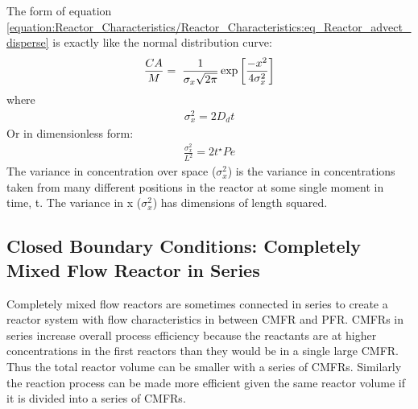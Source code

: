 \documentclass[letterpaper,10pt,english]{sphinxmanual}
\begin{document}
The form of equation \eqref{equation:Reactor_Characteristics/Reactor_Characteristics:eq_Reactor_advect_disperse} is exactly like the normal distribution curve:
\begin{equation}\label{equation:Reactor_Characteristics/Reactor_Characteristics:Reactor_Characteristics/Reactor_Characteristics:8}
\begin{split}\frac{CA}{M} ={\rm \; }\frac{1}{\sigma _{x} \sqrt{2\pi } } \exp \left[\frac{-x^{2} }{4\sigma _{x}^{2} } \right]\end{split}
\end{equation}
where
\begin{equation}\label{equation:Reactor_Characteristics/Reactor_Characteristics:eq_Reactor_sigma_dispersion}
\begin{split} \sigma _{x}^{2} =2D_{d} t\end{split}
\end{equation}
Or in dimensionless form:
\begin{equation}\label{equation:Reactor_Characteristics/Reactor_Characteristics:Reactor_Characteristics/Reactor_Characteristics:9}
\begin{split}\frac{\sigma _{x}^{2} }{L^{2} } =2t^{\star} Pe\end{split}
\end{equation}
The variance in concentration over space (\(\sigma _{x}^{2}\)) is the variance in concentrations taken from many different positions in the reactor at some single moment in time, t. The variance in x (\(\sigma _{x}^{2}\)) has dimensions of length squared.


\subsection{Closed Boundary Conditions: Completely Mixed Flow Reactor in Series}
\label{\detokenize{Reactor_Characteristics/Reactor_Characteristics:closed-boundary-conditions-completely-mixed-flow-reactor-in-series}}
Completely mixed flow reactors are sometimes connected in series to create a reactor system with flow characteristics in between CMFR and PFR. CMFRs in series increase overall process efficiency because the reactants are at higher concentrations in the first reactors than they would be in a single large CMFR. Thus the total reactor volume can be smaller with a series of CMFRs. Similarly the reaction process can be made more efficient given the same reactor volume if it is divided into a series of CMFRs.
\end{document}
